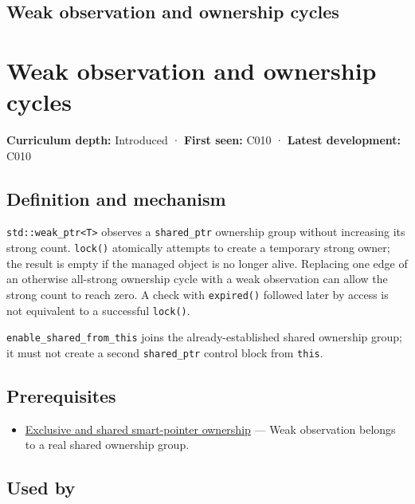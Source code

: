 \hypertarget{appendix-b9548675eb2b}{}
\section*{Weak observation and ownership cycles}
\chapter{Weak observation and ownership cycles}\label{appendix-b9548675eb2b-weak-observation-and-ownership-cycles}

\textbf{Curriculum depth:} Introduced · \textbf{First seen:} C010 · \textbf{Latest development:} C010

\section{Definition and mechanism}\label{appendix-b9548675eb2b-definition-and-mechanism}

\texttt{std::weak\_ptr\textless{}T\textgreater{}} observes a \texttt{shared\_ptr} ownership group without increasing its strong count. \texttt{lock()} atomically attempts to create a temporary strong owner; the result is empty if the managed object is no longer alive. Replacing one edge of an otherwise all-strong ownership cycle with a weak observation can allow the strong count to reach zero. A check with \texttt{expired()} followed later by access is not equivalent to a successful \texttt{lock()}.

\texttt{enable\_shared\_from\_this} joins the already-established shared ownership group; it must not create a second \texttt{shared\_ptr} control block from \texttt{this}.

\section{Prerequisites}\label{appendix-b9548675eb2b-prerequisites}

\begin{itemize}
\tightlist
\item
  \hyperref[appendix-51602cabe815]{Exclusive and shared smart-pointer ownership} --- Weak observation belongs to a real shared ownership group.
\end{itemize}

\section{Used by}\label{appendix-b9548675eb2b-used-by}

